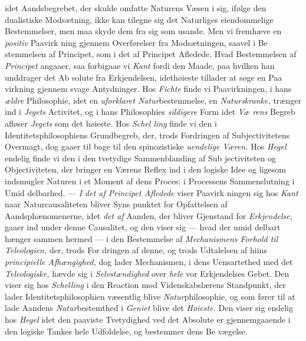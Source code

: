 idet Aandsbegrebet, der skulde omfatte Naturens Væsen i sig,
ifølge den dualistiske Modsætning, ikke kan tilegne sig det
Naturliges eiendommelige Bestemmelser, men maa skyde dem
fra sig som usande. Men vi fremhæve en \emph{positiv} Paavirk\-%
ning gjennem Overførelser fra Modsætningen, saavel i Be\-%
stemmelsen af Principet, som i det af Principet Afledede.
Hvad Bestemmelsen af \emph{Principet} angaaer, saa forbigaae vi
\emph{Kant} fordi den Maade, paa hvilken han unddrager det Ab\-%
solute fra Erkjendelsen, idethøieste tillader at søge en Paa\-%
virkning gjennem svage Antydninger. Hos \emph{Fichte} finde vi
Paavirkningen, i hans \emph{ældre} Philosophie, idet en \emph{uforklaret
Natur}bestemmelse, en \emph{Naturskranke,} trænger ind i \emph{Jegets}
Activitet, og i hans Philosophies \emph{sildigere} Form idet \emph{Væ\-%
rens} Begreb afløser \emph{Jegets} som det høieste. Hos \emph{Schel\-%
ling} finde vi den i Identitetsphilosophiens Grundbegreb, der,
trods Fordringen af Subjectivitetens Overmagt, dog gaaer til\-%
bage til den spinozistiske \emph{uendelige Væren.} Hos \emph{Hegel}
endelig finde vi den i den tvetydige Sammenblanding af Sub\-%
jectiviteten og Objectiviteten, der bringer en Værens Reflex
ind i den logiske Idee og ligesom indsmugler Naturen i et
Moment af dens Proces: i Processens Sammenslutning i Umid\-%
delbarhed. --- \emph{I det af Principet Afledede} viser Paavirk\-%
ningen sig hos \emph{Kant} naar Naturcausaliteten bliver Syns\-%
punktet for Opfattelsen af Aandsphænomenerne, idet \emph{det af}
Aanden, der bliver Gjenstand for \emph{Erkjendelse,} gaaer ind
under denne Causalitet, og den viser sig --- hvad der umid\-%
delbart hænger sammen hermed --- i den Bestemmelse af
\emph{Mechanismens Forhold til Teleologien,} der, trods For\-%
dringen af denne, og trods Udtalelsen af hiins \emph{principielle
Afhængighed,} dog lader Mechanismen, i dens Uensartethed
med det \emph{Teleologiske,} hævde sig i \emph{Selvstændighed} over
\emph{hele} vor Erkjendelses Gebet. Den viser sig hos \emph{Schelling}
i den Reaction mod Videnskabslærens Standpunkt, der lader
Identitetsphilosophien væsentlig blive \emph{Natur}philosophie, og
som fører til at lade Aandens \emph{Natur}bestemthed i \emph{Geniet}
blive det \emph{Høieste.} Den viser sig endelig hos \emph{Hegel} idet den
paaviste Tvetydighed ved det Absolute er gjennemgaaende i
den logiske Tankes hele Udfoldelse, og bestemmer dens Be\-%
vægelse.

